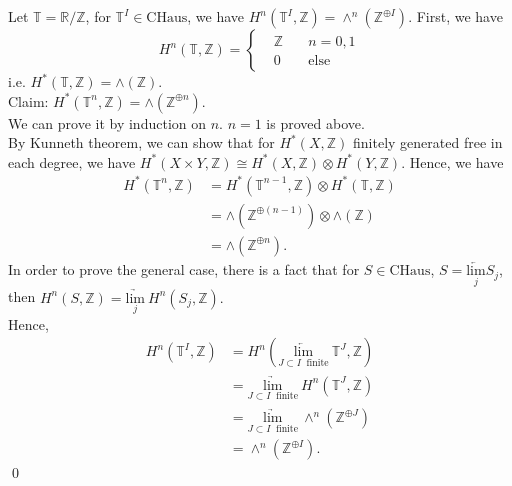 \documentclass[UTF8,12,a4paper]{ctexart}
\theoremstyle{definition}
\begin{document}
\exm
Let $\mathbb{T}=\mathbb{R}/\mathbb{Z}$, for $\mathbb{T}^I\in\text{CHaus}$, we have $H^n(\mathbb{T}^I,\mathbb{Z})=\wedge^n(\mathbb{Z}^{\oplus I}).$
\pf
First, we have
\begin{equation*}
H^n(\mathbb{T},\mathbb{Z})=\left\{
\begin{aligned}
&\mathbb{Z} \quad &n=0, 1\\
&0 \quad &\text{else}
\end{aligned}
\right.
\end{equation*}
i.e. $H^*(\mathbb{T},\mathbb{Z})=\wedge(\mathbb{Z}).$~\\
Claim: $H^*(\mathbb{T}^n,\mathbb{Z})=\wedge(\mathbb{Z}^{\oplus n}).$~\\
We can prove it by induction on $n$. $n=1$ is proved above.\\
By Kunneth theorem, we can show that for $H^*(X,\mathbb{Z})$ finitely generated free in each degree, we have $H^*(X\times Y,\mathbb{Z})\cong H^*(X,\mathbb{Z})\otimes H^*(Y,\mathbb{Z})$. Hence, we have
\begin{align*}
H^*(\mathbb{T}^n,\mathbb{Z})
&= H^*(\mathbb{T}^{n-1},\mathbb{Z})\otimes H^*(\mathbb{T},\mathbb{Z})\\
&=\wedge(\mathbb{Z}^{\oplus (n-1)})\otimes \wedge(\mathbb{Z})\\
&=\wedge(\mathbb{Z}^{\oplus n}).
\end{align*}
In order to prove the general case, there is a fact that for $S\in \text{CHaus}$, $S=\underset{j}{\underleftarrow{\text{lim}}} S_j$, then $
H^n(S,\mathbb{Z})=\underset{j}{\underrightarrow{\text{lim}}}\  H^n(S_j,\mathbb{Z}).$\\
Hence,
\begin{align*}
H^n(\mathbb{T}^I,\mathbb{Z})
&=H^n(\underset{J\subset I\ \text{ finite}}{\underleftarrow{\text{lim}}}\ \mathbb{T}^J,\mathbb{Z})\\
&=\underset{J\subset I\ \text{ finite}}{\underrightarrow{\text{lim}}}\  H^n(\mathbb{T}^J,\mathbb{Z})\\
&=\underset{J\subset I\ \text{ finite}}{\underrightarrow{\text{lim}}}\ \wedge^n(\mathbb{Z}^{\oplus J})\\
&=\wedge^n(\mathbb{Z}^{\oplus I}).
\end{align*}
\qed
\end{document}
